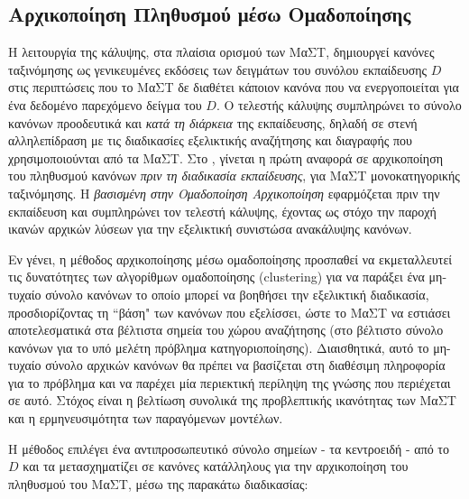 \subsection{Αρχικοποίηση Πληθυσμού μέσω Ομαδοποίησης}
\label{subsec:gmlaslcsClustering}
Η λειτουργία της κάλυψης, στα πλαίσια ορισμού των ΜαΣΤ, δημιουργεί κανόνες ταξινόμησης ως γενικευμένες εκδόσεις των δειγμάτων του συνόλου εκπαίδευσης $D$ στις περιπτώσεις που το ΜαΣΤ δε διαθέτει κάποιον κανόνα που να ενεργοποιείται για ένα δεδομένο παρεχόμενο δείγμα του $D$. Ο τελεστής κάλυψης συμπληρώνει το σύνολο κανόνων προοδευτικά και \emph{κατά τη διάρκεια} της εκπαίδευσης, δηλαδή σε στενή αλληλεπίδραση με τις διαδικασίες εξελικτικής αναζήτησης και διαγραφής που χρησιμοποιούνται από τα ΜαΣΤ. Στο \cite{tzima12}, γίνεται η πρώτη αναφορά σε αρχικοποίηση του πληθυσμού κανόνων \emph{πριν τη διαδικασία εκπαίδευσης}, για ΜαΣΤ μονοκατηγορικής ταξινόμησης. Η \emph{βασισμένη στην Ομαδοποίηση Αρχικοποίηση} εφαρμόζεται πριν την εκπαίδευση και συμπληρώνει τον τελεστή κάλυψης, έχοντας ως στόχο την παροχή ικανών αρχικών λύσεων για την εξελικτική συνιστώσα ανακάλυψης κανόνων. 

Εν γένει, η μέθοδος αρχικοποίησης μέσω ομαδοποίησης προσπαθεί να εκμεταλλευτεί τις δυνατότητες των αλγορίθμων ομαδοποίησης (clustering) για να παράξει ένα μη-τυχαίο σύνολο κανόνων το οποίο μπορεί να βοηθήσει την εξελικτική διαδικασία, προσδιορίζοντας τη “βάση" των κανόνων που εξελίσσει, ώστε το ΜαΣΤ να εστιάσει αποτελεσματικά στα βέλτιστα σημεία του χώρου αναζήτησης (στο βέλτιστο σύνολο κανόνων για το υπό μελέτη πρόβλημα κατηγοριοποίησης). Διαισθητικά, αυτό το μη-τυχαίο σύνολο αρχικών κανόνων θα πρέπει να βασίζεται στη διαθέσιμη πληροφορία για το πρόβλημα και να παρέχει μία περιεκτική περίληψη της γνώσης που περιέχεται σε αυτό. Στόχος είναι η βελτίωση συνολικά της προβλεπτικής ικανότητας των ΜαΣΤ και η ερμηνευσιμότητα των παραγόμενων μοντέλων.

Η μέθοδος επιλέγει ένα αντιπροσωπευτικό σύνολο σημείων - τα κεντροειδή - από το $D$ και τα μετασχηματίζει σε κανόνες κατάλληλους για την αρχικοποίηση του πληθυσμού του ΜαΣΤ, μέσω της παρακάτω διαδικασίας:

